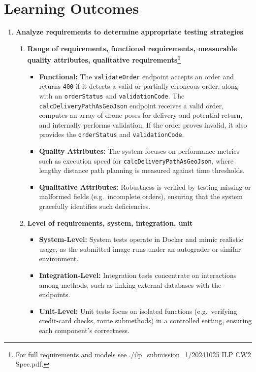 \documentclass{article}
\begin{document}
\section{Learning Outcomes}
\begin{enumerate}
    \item \textbf{Analyze requirements to determine appropriate testing strategies} \marginpar{[default 20\%]}
    \begin{enumerate}
        \item \textbf{Range of requirements, functional requirements, measurable quality attributes, qualitative requirements\footnote{For full requirements and models see ./ilp\_submission\_1/20241025 ILP CW2 Spec.pdf.}}
        \begin{itemize}
            \item \textbf{Functional:}
            The \texttt{validateOrder} endpoint accepts an order and returns \texttt{400} if it detects a valid or partially erroneous order, along with an \texttt{orderStatus} and \texttt{validationCode}.
            The \texttt{calcDeliveryPathAsGeoJson} endpoint receives a valid order, computes an array of drone poses for delivery and potential return, and internally performs validation. 
            If the order proves invalid, it also provides the \texttt{orderStatus} and \texttt{validationCode}. 
            \item \textbf{Quality Attributes:}
            The system focuses on performance metrics such as execution speed for \texttt{calcDeliveryPathAsGeoJson}, where lengthy distance path planning is measured against time thresholds.
            \item \textbf{Qualitative Attributes:}
            Robustness is verified by testing missing or malformed fields (e.g.\ incomplete orders), ensuring that the system gracefully identifies such deficiencies.
        \end{itemize}
    
        \item \textbf{Level of requirements, system, integration, unit}
        \begin{itemize}
            \item \textbf{System-Level:}
            System tests operate in Docker and mimic realistic usage, as the submitted image runs under an autograder or similar environment.
            \item \textbf{Integration-Level:}
            Integration tests concentrate on interactions among methods, such as linking external databases with the endpoints. 
            \item \textbf{Unit-Level:}
            Unit tests focus on isolated functions (e.g.\ verifying credit-card checks, route submethods) in a controlled setting, ensuring each component’s correctness.
        \end{itemize}
        

\end{enumerate}
\end{enumerate}
\end{document}
